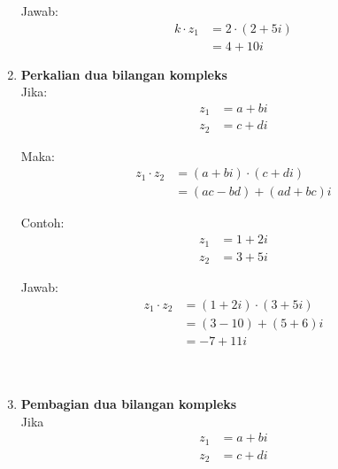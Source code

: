 \documentclass{article}
\begin{document}
\begin{enumerate}
          Jawab:
          \begin{align}
              k \cdot z_1 & = 2 \cdot (2 + 5i)
              \nonumber                        \\
                          & = 4 + 10i
              \nonumber
          \end{align}
          \leavevmode
          \newpage
    \item   \textbf{Perkalian dua bilangan kompleks}\\

          Jika:
          \begin{align}
              z_1 & = a + bi
              \nonumber      \\
              z_2 & = c + di
              \nonumber
          \end{align}

          Maka:
          \begin{align}
              z_1 \cdot z_2 & = (a + bi)\cdot(c + di)
              \nonumber                                \\
                            & = (ac - bd) + (ad + bc)i
              \nonumber
          \end{align}

          Contoh:
          \begin{align}
              z_1 & = 1 + 2i
              \nonumber      \\
              z_2 & = 3 + 5i
              \nonumber
          \end{align}

          Jawab:
          \begin{align}
              z_1 \cdot z_2 & = (1 + 2i) \cdot (3 + 5i)
              \nonumber                                 \\
                            & = (3 - 10) + (5 + 6)i
              \nonumber                                 \\
                            & = -7 + 11i
              \nonumber
          \end{align}
          \leavevmode
          \\\\

    \item   \textbf{Pembagian dua bilangan kompleks}\\

          Jika
          \begin{align}
              z_1 & = a + bi
              \nonumber      \\
              z_2 & = c + di
              \nonumber
          \end{align}


\end{enumerate}
\end{document}
